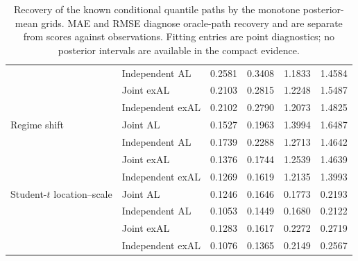 \begin{table}[p]
{\begin{tabular}{@{}>{\raggedright\arraybackslash}p{}>{\raggedright\arraybackslash}p{}rrrr@{}}
 & Independent AL & 0.2581 & 0.3408 & 1.1833 & 1.4584 \\
 & Joint exAL & 0.2103 & 0.2815 & 1.2248 & 1.5487 \\
 & Independent exAL & 0.2102 & 0.2790 & 1.2073 & 1.4825 \\
\addlinespace[2pt]
Regime shift & Joint AL & 0.1527 & 0.1963 & 1.3994 & 1.6487 \\
 & Independent AL & 0.1739 & 0.2288 & 1.2713 & 1.4642 \\
 & Joint exAL & 0.1376 & 0.1744 & 1.2539 & 1.4639 \\
 & Independent exAL & 0.1269 & 0.1619 & 1.2135 & 1.3993 \\
\addlinespace[2pt]
Student-\(t\) location--scale & Joint AL & 0.1246 & 0.1646 & 0.1773 & 0.2193 \\
 & Independent AL & 0.1053 & 0.1449 & 0.1680 & 0.2122 \\
 & Joint exAL & 0.1283 & 0.1617 & 0.2272 & 0.2719 \\
 & Independent exAL & 0.1076 & 0.1365 & 0.2149 & 0.2567 \\
\bottomrule
\end{tabular}
}%
\caption{Recovery of the known conditional quantile paths by the monotone posterior-mean grids. MAE and RMSE diagnose oracle-path recovery and are separate from scores against observations. Fitting entries are point diagnostics; no posterior intervals are available in the compact evidence.}
\label{tab:joint-qdesn-pure-desn-v1-oracle}
\end{table}
